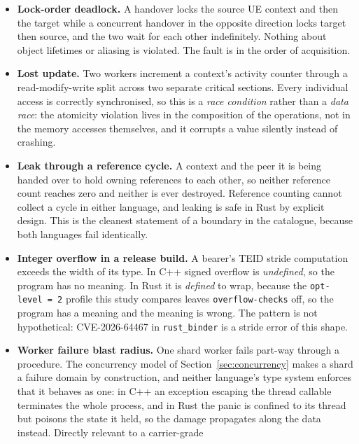 \documentclass[english,oneside,a4paper,censored,csm,software-track-2020]{HYthesisML}
\begin{document}
\begin{itemize}
  \item \textbf{Lock-order deadlock.} A handover locks the source UE context and then the
        target while a concurrent handover in the opposite direction locks target then source,
        and the two wait for each other indefinitely. Nothing about object lifetimes or
        aliasing is violated. The fault is in the order of acquisition.
  \item \textbf{Lost update.} Two workers increment a context's activity counter through a
        read-modify-write split across two separate critical sections. Every individual access
        is correctly synchronised, so this is a \emph{race condition} rather than a
        \emph{data race}: the atomicity violation lives in the composition of the operations,
        not in the memory accesses themselves, and it corrupts a value silently instead of
        crashing.
  \item \textbf{Leak through a reference cycle.} A context and the peer it is being handed
        over to hold owning references to each other, so neither reference count reaches zero
        and neither is ever destroyed. Reference counting cannot collect a cycle in either
        language, and leaking is safe in Rust by explicit design. This is the cleanest
        statement of a boundary in the catalogue, because both languages fail identically.
  \item \textbf{Integer overflow in a release build.} A bearer's TEID stride computation
        exceeds the width of its type. In C++ signed overflow is \emph{undefined}, so the
        program has no meaning. In Rust it is \emph{defined} to wrap, because the
        \texttt{opt-level~=~2} profile this study compares leaves \texttt{overflow-checks}
        off, so the program has a meaning and the meaning is wrong. The pattern is not
        hypothetical: CVE-2026-64467 in \texttt{rust\_binder} is a stride error of this shape.
  \item \textbf{Worker failure blast radius.} One shard worker fails part-way through a
        procedure. The concurrency model of Section~\ref{sec:concurrency} makes a shard
        a failure domain by construction, and neither language's type system enforces that it
        behaves as one: in C++ an exception escaping the thread callable terminates the whole
        process, and in Rust the panic is confined to its thread but poisons the state it held,
        so the damage propagates along the data instead. Directly relevant to a carrier-grade

\end{itemize}
\end{document}
